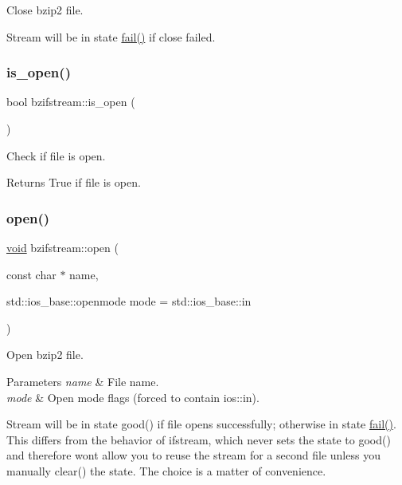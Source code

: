 Close bzip2 file. 

Stream will be in state \hyperlink{_constraint_macros_8h_a73a3b169ac8c3419cbe15327e75ffcfd}{fail()} if close failed. \mbox{\label{classbzifstream_a442f2f140a70f59f1580c8344b0dc441}} 
\subsubsection{\texorpdfstring{is\+\_\+open()}{is\_open()}}
{\footnotesize\ttfamily bool bzifstream\+::is\+\_\+open (\begin{DoxyParamCaption}{ }\end{DoxyParamCaption})\hspace{0.3cm}{\ttfamily [inline]}}



Check if file is open. 

\begin{DoxyReturn}{Returns}
True if file is open. 
\end{DoxyReturn}
\mbox{\label{classbzifstream_aebe1df7c3afcdd96f729ed6601e13072}} 
\subsubsection{\texorpdfstring{open()}{open()}}
{\footnotesize\ttfamily \hyperlink{lp__lib_8h_ac7828c7b2b31d2e11af17bdb6289c5d9}{void} bzifstream\+::open (\begin{DoxyParamCaption}\item[{const char $\ast$}]{name,  }\item[{std\+::ios\+\_\+base\+::openmode}]{mode = {\ttfamily std\+:\+:ios\+\_\+base\+:\+:in} }\end{DoxyParamCaption})}



Open bzip2 file. 


\begin{DoxyParams}{Parameters}
{\em name} & File name. \\
\hline
{\em mode} & Open mode flags (forced to contain ios\+::in).\\
\hline
\end{DoxyParams}
Stream will be in state good() if file opens successfully; otherwise in state \hyperlink{_constraint_macros_8h_a73a3b169ac8c3419cbe15327e75ffcfd}{fail()}. This differs from the behavior of ifstream, which never sets the state to good() and therefore won\textquotesingle{}t allow you to reuse the stream for a second file unless you manually clear() the state. The choice is a matter of convenience. \mbox{\label{classbzifstream_a07147737294e17e3d9ff3da4ab2ca8f5}} 
